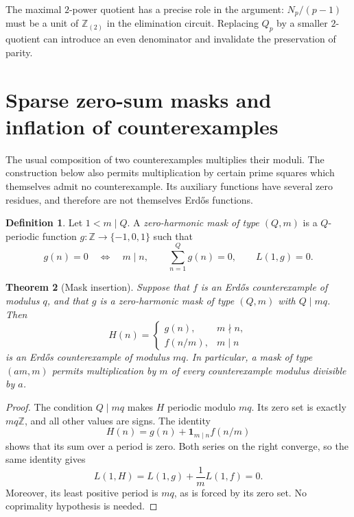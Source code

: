 \documentclass[11pt]{amsart}
\newtheorem{theorem}{Theorem}[section]
\theoremstyle{definition}
\newtheorem{definition}[theorem]{Definition}
\theoremstyle{remark}
\newcommand{\Zt}{\mathbb Z_{(2)}}
\numberwithin{equation}{section}
\begin{document}
The maximal $2$-power quotient has a precise role in the argument:
$N_p/(p-1)$ must be a unit of $\Zt$ in the elimination circuit.
Replacing $Q_p$ by a smaller $2$-quotient can introduce an even
denominator and invalidate the preservation of parity.


\section{Sparse zero-sum masks and inflation of counterexamples}
\label{sec:sparse-inflation}

The usual composition of two counterexamples multiplies their moduli.
The construction below also permits multiplication by certain prime squares
which themselves admit no counterexample.  Its auxiliary functions have
several zero residues, and therefore are not themselves Erd\H{o}s functions.

\begin{definition}
Let $1<m\mid Q$. A \emph{zero-harmonic mask of type $(Q,m)$} is a
$Q$-periodic function $g\colon\mathbb Z\to\{-1,0,1\}$ such that
\[
 g(n)=0\quad\Longleftrightarrow\quad m\mid n,
 \qquad \sum_{n=1}^{Q}g(n)=0,
 \qquad L(1,g)=0.
\]
\end{definition}

\begin{theorem}[Mask insertion]
\label{thm:mask-insertion}
Suppose that $f$ is an Erd\H{o}s counterexample of modulus $q$, and that
$g$ is a zero-harmonic mask of type $(Q,m)$ with $Q\mid mq$. Then
\[
 H(n)=
 \begin{cases}
 g(n),&m\nmid n,\\
 f(n/m),&m\mid n
 \end{cases}
\]
is an Erd\H{o}s counterexample of modulus $mq$. In particular, a mask of
type $(am,m)$ permits multiplication by $m$ of every counterexample modulus
divisible by $a$.
\end{theorem}

\begin{proof}
The condition $Q\mid mq$ makes $H$ periodic modulo $mq$. Its zero set is
exactly $mq\mathbb Z$, and all other values are signs. The identity
\[
 H(n)=g(n)+\boldsymbol{1}_{m\mid n}f(n/m)
\]
shows that its sum over a period is zero. Both series on the right converge,
so the same identity gives
\[
 L(1,H)=L(1,g)+\frac1m L(1,f)=0.
\]
Moreover, its least positive period is $mq$, as is forced by its zero set.
No coprimality hypothesis is needed.
\end{proof}
\end{document}
